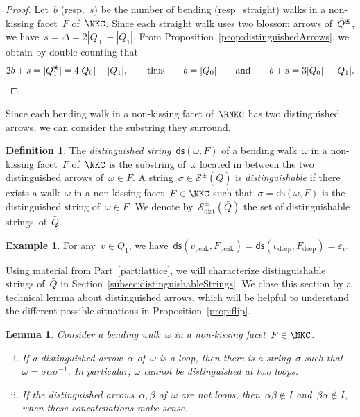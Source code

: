 \documentclass{amsart}
\newtheorem{lemma}[theorem]{Lemma}
\theoremstyle{definition}
\newtheorem{definition}[theorem]{Definition}
\newtheorem{example}[theorem]{Example}
\newcommand{\darkblue}{\color{darkblue}} %
\newcommand{\defn}[1]{\textsl{\darkblue #1}} %
\newcommand{\blossom}{^\text{\ding{96}}} %
\newcommand{\strings}{\mathcal{S}} %
\newcommand{\distinguishableStrings}{\mathcal{S}_\mathrm{dist}} %
\newcommand{\distinguishedString}[2]{\mathsf{ds}(#1,#2)} %
\newcommand{\peak}{\mathrm{peak}} %
\newcommand{\deep}{\mathrm{deep}} %
\begin{document}
\begin{proof}
Let~$b$ (resp.~$s$) be the number of bending (resp.~straight) walks in a non-kissing facet~$F$ of~$\NKC$.
Since each straight walk uses two blossom arrows of~$\bar Q\blossom$, we have~$s = \Delta = 2|Q_0|-|Q_1|$.
From Proposition~\ref{prop:distinguishedArrows}, we obtain by double counting that
\[
2b+s = |Q\blossom_1| = 4|Q_0|-|Q_1|,
\qquad\text{thus}\qquad
b = |Q_0|
\qquad\text{and}\qquad
b+s = 3|Q_0|-|Q_1|.
\qedhere
\]
\end{proof}

\pagebreak

Since each bending walk in a non-kissing facet of~$\RNKC$ has two distinguished arrows, we can consider the substring they surround.

\begin{definition}
\label{def:distinguishedSubstring}
The \defn{distinguished string}~$\distinguishedString{\omega}{F}$ of a bending walk~$\omega$ in a non-kissing facet~$F$ of~$\NKC$ is the substring of~$\omega$ located in between the two distinguished arrows of~$\omega \in F$.
A string~${\sigma \in \strings^\pm(\bar Q)}$ is \defn{distinguishable} if there exists a walk~$\omega$ in a non-kissing facet~$F \in \NKC$ such that~$\sigma = \distinguishedString{\omega}{F}$ is the distinguished string of~$\omega \in F$.
We denote by~$\distinguishableStrings^\pm(\bar Q)$ the set of distinguishable strings~of~$\bar Q$.
\end{definition}

\begin{example}
For any~$v \in Q_1$, we have~$\distinguishedString{v_\peak}{F_\peak} = \distinguishedString{v_\deep}{F_\deep} = \varepsilon_v$.
\end{example}

Using material from Part~\ref{part:lattice}, we will characterize distinguishable strings of~$\bar Q$ in Section~\ref{subsec:distinguishableStrings}.
We close this section by a technical lemma about distinguished arrows, which will be helpful to understand the different possible situations in Proposition~\ref{prop:flip}.

\begin{lemma}
\label{lem:weirdDistinguishedArrows}
Consider a bending walk~$\omega$ in a non-kissing facet~$F \in \NKC$.
\begin{enumerate}[(i)]
\item If a distinguished arrow~$\alpha$ of~$\omega$ is a loop, then there is a string~$\sigma$ such that~${\omega = \sigma \alpha \sigma^{-1}}$. In particular, $\omega$ cannot be distinguished at two loops.
\item If the distinguished arrows~$\alpha, \beta$ of~$\omega$ are not loops, then~$\alpha \beta \notin I$ and~$\beta \alpha \notin I$, when these concatenations make sense.
\end{enumerate}
\end{lemma}
\end{document}

